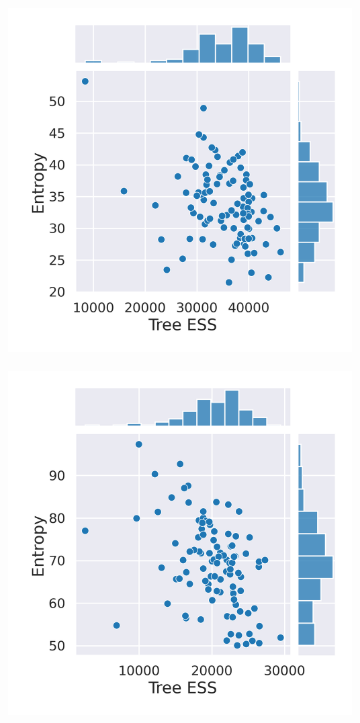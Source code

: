 \documentclass[10pt,letterpaper]{article}
\begin{document}
\begin{figure}
	\caption{The entropy and the effective sample size for the different datasets.}
	
	\centering
	\begin{subfigure}[b]{0.4\textwidth}
		\centering
		\includegraphics[width=\textwidth]{figures/yule-100-ccd1-entropy-ess.png}
	\end{subfigure}
	\begin{subfigure}[b]{0.4\textwidth}
		\centering
		\includegraphics[width=\textwidth]{figures/yule-200-ccd1-entropy-ess.png}
	\end{subfigure}
	

\end{figure}
\end{document}
